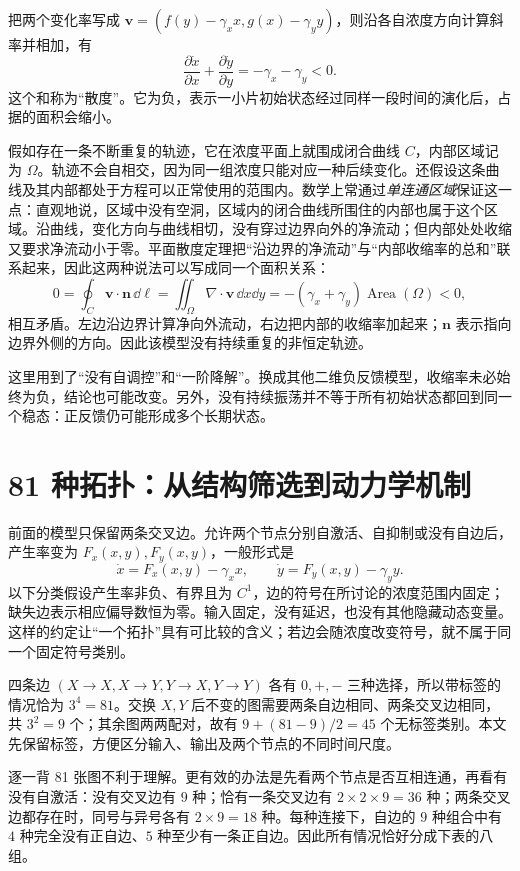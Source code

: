 把两个变化率写成 $\bm v=(f(y)-\gamma_xx,g(x)-\gamma_yy)$，则沿各自浓度方向计算斜率并相加，有
\[
\frac{\partial\dot x}{\partial x}+\frac{\partial\dot y}{\partial y}=-\gamma_x-\gamma_y<0.
\]
这个和称为“散度”。它为负，表示一小片初始状态经过同样一段时间的演化后，占据的面积会缩小。

假如存在一条不断重复的轨迹，它在浓度平面上就围成闭合曲线 $C$，内部区域记为 $\Omega$。轨迹不会自相交，因为同一组浓度只能对应一种后续变化。还假设这条曲线及其内部都处于方程可以正常使用的范围内。数学上常通过\emph{单连通区域}保证这一点：直观地说，区域中没有空洞，区域内的闭合曲线所围住的内部也属于这个区域。沿曲线，变化方向与曲线相切，没有穿过边界向外的净流动；但内部处处收缩又要求净流动小于零。平面散度定理把“沿边界的净流动”与“内部收缩率的总和”联系起来，因此这两种说法可以写成同一个面积关系：
\[
0=\oint_C\bm v\cdot\bm n\,\dd\ell
=\iint_\Omega\nabla\cdot\bm v\,\dd x\dd y
=-(\gamma_x+\gamma_y)\operatorname{Area}(\Omega)<0,
\]
相互矛盾。左边沿边界计算净向外流动，右边把内部的收缩率加起来；$\bm n$ 表示指向边界外侧的方向。因此该模型没有持续重复的非恒定轨迹。

这里用到了“没有自调控”和“一阶降解”。换成其他二维负反馈模型，收缩率未必始终为负，结论也可能改变。另外，没有持续振荡并不等于所有初始状态都回到同一个稳态：正反馈仍可能形成多个长期状态。

\section{81 种拓扑：从结构筛选到动力学机制}
前面的模型只保留两条交叉边。允许两个节点分别自激活、自抑制或没有自边后，产生率变为 $F_x(x,y),F_y(x,y)$，一般形式是
\begin{equation}
\dot x=F_x(x,y)-\gamma_xx,\qquad
\dot y=F_y(x,y)-\gamma_yy.\label{eq:two_general}
\end{equation}
以下分类假设产生率非负、有界且为 $C^1$，边的符号在所讨论的浓度范围内固定；缺失边表示相应偏导数恒为零。输入固定，没有延迟，也没有其他隐藏动态变量。这样的约定让“一个拓扑”具有可比较的含义；若边会随浓度改变符号，就不属于同一个固定符号类别。

四条边 $(X\to X,X\to Y,Y\to X,Y\to Y)$ 各有 $0,+,-$ 三种选择，所以带标签的情况恰为 $3^4=81$。交换 $X,Y$ 后不变的图需要两条自边相同、两条交叉边相同，共 $3^2=9$ 个；其余图两两配对，故有 $9+(81-9)/2=45$ 个无标签类别。本文先保留标签，方便区分输入、输出及两个节点的不同时间尺度。

逐一背 81 张图不利于理解。更有效的办法是先看两个节点是否互相连通，再看有没有自激活：没有交叉边有 $9$ 种；恰有一条交叉边有 $2\times2\times9=36$ 种；两条交叉边都存在时，同号与异号各有 $2\times9=18$ 种。每种连接下，自边的 $9$ 种组合中有 $4$ 种完全没有正自边、$5$ 种至少有一条正自边。因此所有情况恰好分成下表的八组。

